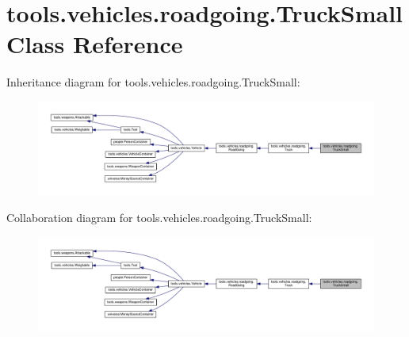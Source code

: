 \hypertarget{classtools_1_1vehicles_1_1roadgoing_1_1_truck_small}{}\section{tools.\+vehicles.\+roadgoing.\+Truck\+Small Class Reference}
\label{classtools_1_1vehicles_1_1roadgoing_1_1_truck_small}


Inheritance diagram for tools.\+vehicles.\+roadgoing.\+Truck\+Small\+:
\nopagebreak
\begin{figure}[H]
\begin{center}
\leavevmode
\includegraphics[width=350pt]{classtools_1_1vehicles_1_1roadgoing_1_1_truck_small__inherit__graph}
\end{center}
\end{figure}


Collaboration diagram for tools.\+vehicles.\+roadgoing.\+Truck\+Small\+:
\nopagebreak
\begin{figure}[H]
\begin{center}
\leavevmode
\includegraphics[width=350pt]{classtools_1_1vehicles_1_1roadgoing_1_1_truck_small__coll__graph}
\end{center}
\end{figure}
